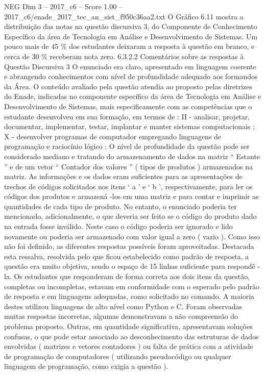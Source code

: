 \begin{textsample}{NEG Dim 3 – 2017\_c6 – Score 1.00 – 2017\_c6/enade\_2017\_tec\_an\_sist\_f950c36aa2.txt}
O Gráfico 6.11 mostra a distribuição das notas na questão discursiva 3, do Componente de Conhecimento Específico da área de Tecnologia em Análise e Desenvolvimento de Sistemas.
Um pouco mais de 45 \% dos estudantes deixaram a resposta à questão em branco, e cerca de 30 \% receberam nota zero. 6.3.2.2 Comentários sobre as respostas à Questão Discursiva 3 O enunciado era claro, apresentado em linguagem coerente e abrangendo conhecimentos com nível de profundidade adequado aos formandos da Área.
O conteúdo avaliado pela questão atendia ao proposto pelas diretrizes do Enade, indicadas no componente específico da área de Tecnologia em Análise e Desenvolvimento de Sistemas, mais especificamente com as competências que o estudante desenvolveu em sua formação, em termos de : II - analisar, projetar, documentar, implementar, testar, implantar e manter sistemas computacionais ; X - desenvolver programas de computador empregando linguagens de programação e raciocínio lógico ; O nível de profundidade da questão pode ser considerado mediano e tratando do armazenamento de dados na matriz “ Estante ” e de um vetor “ Contador dos valores ” ( tipos de produtos ) armazenados na matriz.
As informações e os dados eram suficientes para as apresentações de trechos de códigos solicitados nos itens ‘ a ’ e ‘ b ’, respectivamente, para ler os códigos dos produtos e armazená -los em uma matriz e para contar e imprimir as quantidades de cada tipo de produto.
No entanto, o enunciado poderia ter mencionado, adicionalmente, o que deveria ser feito se o código do produto dado na entrada fosse inválido.
Neste caso o código poderia ser ignorado e lido novamente ou poderia ser armazenado com valor igual a zero ( vazio ).
Como isso não foi definido, as diferentes respostas possíveis foram aproveitadas.
Destacada esta ressalva, resolvida pelo que ficou estabelecido como padrão de resposta, a questão era muito objetiva, sendo o espaço de 15 linhas suficiente para respondê -la.
Os estudantes que responderam de forma correta aos dois itens da questão, completas ou incompletas, estavam em conformidade com o esperado pelo padrão de resposta e em linguagens adequadas, como solicitado no comando.
A maioria destes utilizou linguagens de alto nível como Python e C.
Foram observadas muitas respostas incorretas, algumas demonstravam a não compreensão do problema proposto.
Outras, em quantidade significativa, apresentavam soluções confusas, o que pode estar associado ao desconhecimento das estruturas de dados envolvidas ( matrizes e vetores contadores ) ou falta de prática com a atividade de programação de computadores ( utilizando pseudocódigo ou qualquer linguagem de programação, como exigia a questão ).

\end{textsample}
